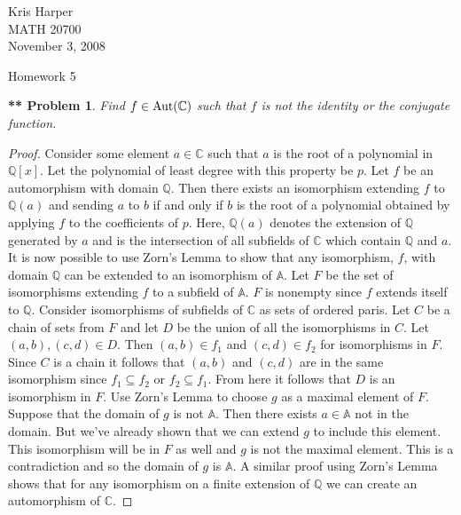 \documentclass{article}
\newtheorem{**}{** Problem}
\newcommand{\aut}[1]{\textup{Aut}(#1)}
\begin{document}
\begin{flushright}
Kris Harper\\

MATH 20700\\

November 3, 2008
\end{flushright}

\begin{center}
Homework 5
\end{center}

\begin{flushleft}

\begin{**}
Find $f \in \aut{\mathbb{C}}$ such that $f$ is not the identity or the conjugate function.
\end{**}
\begin{proof}
Consider some element $a \in \mathbb{C}$ such that $a$ is the root of a polynomial in $\mathbb{Q}[x]$. Let the polynomial of least degree with this property be $p$. Let $f$ be an automorphism with domain $\mathbb{Q}$. Then there exists an isomorphism extending $f$ to $\mathbb{Q}(a)$ and sending $a$ to $b$ if and only if $b$ is the root of a polynomial obtained by applying $f$ to the coefficients of $p$. Here, $\mathbb{Q}(a)$ denotes the extension of $\mathbb{Q}$ generated by $a$ and is the intersection of all subfields of $\mathbb{C}$ which contain $\mathbb{Q}$ and $a$. It is now possible to use Zorn's Lemma to show that any isomorphism, $f$, with domain $\mathbb{Q}$ can be extended to an isomorphism of $\mathbb{A}$. Let $F$ be the set of isomorphisms extending $f$ to a subfield of $\mathbb{A}$. $F$ is nonempty since $f$ extends itself to $\mathbb{Q}$. Consider isomorphisms of subfields of $\mathbb{C}$ as sets of ordered paris. Let $C$ be a chain of sets from $F$ and let $D$ be the union of all the isomorphisms in $C$. Let $(a,b), (c,d) \in D$. Then $(a,b) \in f_1$ and $(c,d) \in f_2$ for isomorphisms in $F$. Since $C$ is a chain it follows that $(a,b)$ and $(c,d)$ are in the same isomorphism since $f_1 \subseteq f_2$ or $f_2 \subseteq f_1$. From here it follows that $D$ is an isomorphism in $F$. Use Zorn's Lemma to choose $g$ as a maximal element of $F$. Suppose that the domain of $g$ is not $\mathbb{A}$. Then there exists $a \in \mathbb{A}$ not in the domain. But we've already shown that we can extend $g$ to include this element. This isomorphism will be in $F$ as well and $g$ is not the maximal element. This is a contradiction and so the domain of $g$ is $\mathbb{A}$. A similar proof using Zorn's Lemma shows that for any isomorphism on a finite extension of $\mathbb{Q}$ we can create an automorphism of $\mathbb{C}$.
\end{proof}


\end{flushleft}
\end{document}
